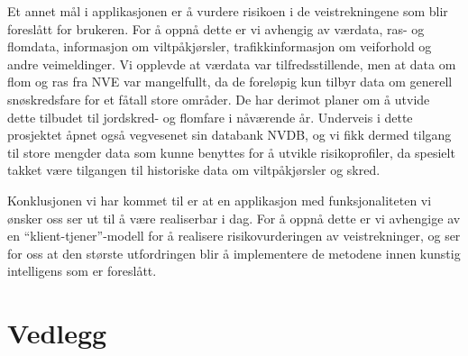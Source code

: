 \documentclass[a4paper,norsk,oneside]{book}
\begin{document}
Et annet mål i applikasjonen er å vurdere risikoen i de veistrekningene som blir foreslått for brukeren. For å oppnå dette er vi avhengig av værdata, ras- og flomdata, informasjon om viltpåkjørsler, trafikkinformasjon om veiforhold og andre veimeldinger. Vi opplevde at værdata var tilfredsstillende, men at data om flom og ras fra NVE var mangelfullt, da de foreløpig kun tilbyr data om generell snøskredsfare for et fåtall store områder. De har derimot planer om å utvide dette tilbudet til jordskred- og flomfare i nåværende år. Underveis i dette prosjektet åpnet også vegvesenet sin databank NVDB, og vi fikk dermed tilgang til store mengder data som kunne benyttes for å utvikle risikoprofiler, da spesielt takket være tilgangen til historiske data om viltpåkjørsler og skred.

Konklusjonen vi har kommet til er at en applikasjon med funksjonaliteten vi ønsker oss ser ut til å være realiserbar i dag. For å oppnå dette er vi avhengige av en “klient-tjener”-modell for å realisere risikovurderingen av veistrekninger, og ser for oss at den største utfordringen blir å implementere de metodene innen kunstig intelligens som er foreslått.



\backmatter




%


\chapter{Vedlegg}
\label{cha:appendices}
\end{document}
